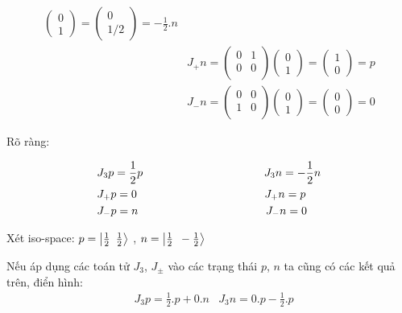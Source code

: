 \documentclass{report}
\begin{document}
\begin{align*}
\begin{pmatrix}
			0 \\ 1
		\end{pmatrix} = \begin{pmatrix}
			0 \\ 1/2
		\end{pmatrix} = - \frac{1}{2}.n \\
		& J_{+} n = \begin{pmatrix}
			0 & 1 \\
			0 & 0 \\
		\end{pmatrix} \begin{pmatrix}
			0 \\ 1
		\end{pmatrix} = \begin{pmatrix}
			1 \\ 0
		\end{pmatrix} = p \\
		& J_{-} n = \begin{pmatrix}
			0 & 0 \\
			1 & 0 \\
		\end{pmatrix} \begin{pmatrix}
			0 \\ 1
		\end{pmatrix} = \begin{pmatrix}
			0 \\ 0
		\end{pmatrix} = 0
	\end{align*}
	
Rõ ràng:

	\begin{align*}
		& J_{3}p = \frac{1}{2}p \hspace*{3.8cm} J_{3}n = - \frac{1}{2}n \\
		& J_{+}p = 0 \hspace*{4cm} J_{+}n = p \\
		& J_{-}p = n \hspace*{4cm} J_{-}n = 0 \\
	\end{align*}
	
Xét iso-space: \( p = \left| \frac{1}{2} \enskip \frac{1}{2} \right\rangle\ \), \( n = \left| \frac{1}{2} \enskip - \frac{1}{2} \right\rangle\ \)

Nếu áp dụng các toán tử \( J_{3} \), \( J_{\pm} \) vào các trạng thái \( p \), \( n \) ta cũng có các kết quả trên, điển hình:
	\begin{align*}
		& J_{3}p = \frac{1}{2}.p + 0.n
		& J_{3}n = 0.p - \frac{1}{2}.p
	\end{align*}
	
\end{document}
